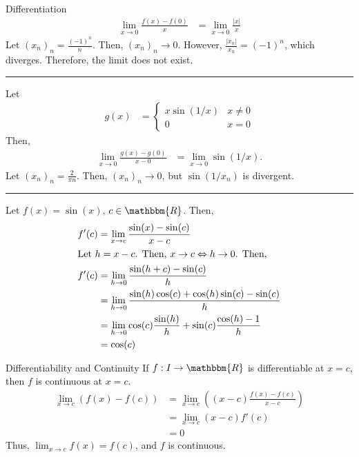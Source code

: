 \documentclass[10pt]{extarticle}
\newcommand{\R}{\mathbbm{R}}
\begin{document}
\begin{problem}{Differentiation}
    \begin{align*}
      \lim_{x\rightarrow 0}\frac{f(x) - f(0)}{x} &= \lim_{x\rightarrow 0}\frac{|x|}{x}
    \end{align*}
    Let $(x_n)_n = \frac{(-1)^n}{n}$. Then, $(x_n)_n \rightarrow 0$. However, $\frac{|x_n|}{x_n} = (-1)^{n}$, which diverges. Therefore, the limit does not exist.\\
    \vspace{4pt}
    \rule{\textwidth}{0.4pt}
    \vspace{4pt}
    Let
    \begin{align*}
      g(x) &= \begin{cases}
        x\sin(1/x) & x\neq 0\\
        0 & x=0
      \end{cases}
    \end{align*}
    Then,
    \begin{align*}
      \lim_{x\rightarrow 0} \frac{g(x) - g(0)}{x-0} &= \lim_{x\rightarrow 0}\sin(1/x).
    \end{align*}
    Let $(x_n)_n = \frac{2}{\pi n}$. Then, $(x_n)_n \rightarrow 0$, but $\sin(1/x_n)$ is divergent.\\
    \vspace{4pt}
    \rule{\textwidth}{0.4pt}
    \vspace{4pt}
    Let $f(x) = \sin(x)$, $c\in\R$. Then,
    \begin{align*}
      f'(c) &= \lim_{x\rightarrow c} \frac{\sin(x) - \sin(c)}{x-c}\\
      \shortintertext{Let $h = x-c$. Then, $x\rightarrow c \Leftrightarrow h\rightarrow 0$. Then,}
      f'(c) &= \lim_{h\rightarrow 0}\frac{\sin(h+c) - \sin(c)}{h}\\
            &= \lim_{h\rightarrow 0}\frac{\sin(h)\cos(c) + \cos(h)\sin(c) - \sin(c)}{h}\\
            &= \lim_{h\rightarrow 0}\cos(c)\frac{\sin(h)}{h} + \sin(c)\frac{\cos(h) - 1}{h}\\
            &= \cos(c)
    \end{align*}
  \end{problem}
  \begin{problem}{Differentiability and Continuity}
    If $f: I\rightarrow \R$ is differentiable at $x=c$, then $f$ is continuous at $x=c$.
    \tcblower
    \begin{align*}
      \lim_{x\rightarrow c}\left(f(x) - f(c)\right) &= \lim_{x\rightarrow c}\left(\left(x-c\right)\frac{f(x) - f(c)}{x-c}\right)\\
                                                    &= \lim_{x\rightarrow c}(x-c)f'(c)\\
                                                    &= 0
    \end{align*}
    Thus, $\lim_{x\rightarrow c}f(x) = f(c)$, and $f$ is continuous.
  \end{problem}
\end{document}
